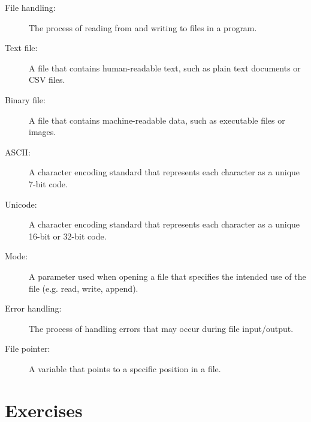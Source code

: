\begin{description}
	\item[File handling:] The process of reading from and writing to files in a program.
	\item[Text file:] A file that contains human-readable text, such as plain text documents or CSV files.
	\item[Binary file:] A file that contains machine-readable data, such as executable files or images.
	\item[ASCII:] A character encoding standard that represents each character as a unique 7-bit code.
	\item[Unicode:] A character encoding standard that represents each character as a unique 16-bit or 32-bit code.
	\item[Mode:] A parameter used when opening a file that specifies the intended use of the file (e.g. read, write, append).
	\item[Error handling:] The process of handling errors that may occur during file input/output.
	\item[File pointer:] A variable that points to a specific position in a file.
\end{description}

\section{Exercises}
\setcounter{exercisenum}{0}




